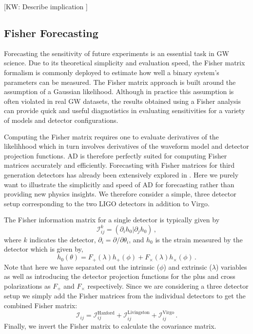 \documentclass[twocolumn]{aastex631}
\newcommand{\kw}[1]{{\color{rb4}[KW: #1 ]}}
\begin{document}
\kw{Describe implication}


\subsection{Fisher Forecasting}
\label{subsec:fisher}

Forecasting the sensitivity of future experiments is an essential task in GW science.
Due to its theoretical simplicity and evaluation speed, the Fisher matrix formalism is commonly deployed to estimate how well a binary system's parameters can be measured.
The Fisher matrix approach is built around the assumption of a Gaussian likelihood.
Although in practice this assumption is often violated in real GW datasets, the results obtained using a Fisher analysis can provide quick and useful diagnotistics in evaluating sensitivities for a variety of models and detector configurations.

Computing the Fisher matrix requires one to evaluate derivatives of the likelihhood which in turn involves derivatives of the waveform model and detector projection functions.
AD is therefore perfectly suited for computing Fisher matrices accurately and efficiently. 
Forecasting with Fisher matrices for third generation detectors has already been extensively explored in \citep{Iacovelli:2022bbs, Iacovelli:2022mbg}.
Here we purely want to illustrate the simplicitly and speed of AD for forecasting rather than providing new physics insights.
We therefore consider a simple, three detector setup corresponding to the two LIGO detectors in addition to Virgo.

The Fisher information matrix for a single detector is typically given by 
\begin{equation}
    \mathcal{I}^{k}_{ij} = (\partial_i h_0 | \partial_j h_0) \, ,
\end{equation}
where $k$ indicates the detector, $\partial_i = \partial/\partial \theta_i$, and $h_0$ is the strain measured by the detector which is given by,
\begin{equation}
    h_0(\theta) = F_+(\lambda) h_{+}(\phi) + F_\times(\lambda) h_{\times}(\phi) \, .
\end{equation}
Note that here we have separated out the intrinsic ($\phi$) and extrinsic ($\lambda$) variables as well as introducing the detector projection functions for the plus and cross polarizations as $F_+$ and $F_\times$ respectively.
Since we are considering a three detector setup we simply add the Fisher matrices from the individual detectors to get the combined Fisher matrix:
\begin{equation}
    \mathcal{I}_{ij} =  \mathcal{I}^{\mathrm{Hanford}}_{ij} + \mathcal{I}^{\mathrm{Livingston}}_{ij} + \mathcal{I}^{\mathrm{Virgo}}_{ij}   \, .
\end{equation}
Finally, we invert the Fisher matrix to calculate the covariance matrix.
\end{document}
